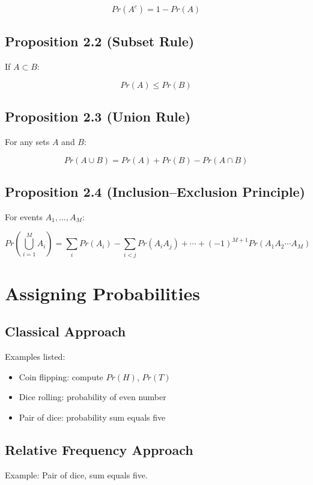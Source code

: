\documentclass[12pt]{article}
\begin{document}
\[
Pr(A^c) = 1 - Pr(A)
\]

\subsection*{Proposition 2.2 (Subset Rule)}

If $A \subset B$:

\[
Pr(A) \le Pr(B)
\]

\subsection*{Proposition 2.3 (Union Rule)}

For any sets $A$ and $B$:

\[
Pr(A \cup B) = Pr(A) + Pr(B) - Pr(A \cap B)
\]

\subsection*{Proposition 2.4 (Inclusion--Exclusion Principle)}

For events $A_1, \dots, A_M$:

\[
Pr\left(\bigcup_{i=1}^{M} A_i\right)
= \sum_i Pr(A_i) - \sum_{i<j} Pr(A_iA_j) + \cdots + (-1)^{M+1}Pr(A_1A_2\cdots A_M)
\]

\section{Assigning Probabilities}

\subsection{Classical Approach}

Examples listed:

\begin{itemize}
    \item Coin flipping: compute $Pr(H)$, $Pr(T)$
    \item Dice rolling: probability of even number
    \item Pair of dice: probability sum equals five
\end{itemize}

\subsection{Relative Frequency Approach}

Example: Pair of dice, sum equals five.
\end{document}
